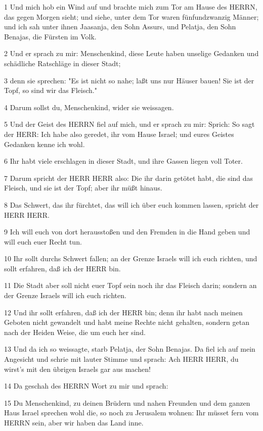 \par 1 Und mich hob ein Wind auf und brachte mich zum Tor am Hause des HERRN, das gegen Morgen sieht; und siehe, unter dem Tor waren fünfundzwanzig Männer; und ich sah unter ihnen Jaasanja, den Sohn Assurs, und Pelatja, den Sohn Benajas, die Fürsten im Volk.
\par 2 Und er sprach zu mir: Menschenkind, diese Leute haben unselige Gedanken und schädliche Ratschläge in dieser Stadt;
\par 3 denn sie sprechen: "Es ist nicht so nahe; laßt uns nur Häuser bauen! Sie ist der Topf, so sind wir das Fleisch."
\par 4 Darum sollst du, Menschenkind, wider sie weissagen.
\par 5 Und der Geist des HERRN fiel auf mich, und er sprach zu mir: Sprich: So sagt der HERR: Ich habe also geredet, ihr vom Hause Israel; und eures Geistes Gedanken kenne ich wohl.
\par 6 Ihr habt viele erschlagen in dieser Stadt, und ihre Gassen liegen voll Toter.
\par 7 Darum spricht der HERR HERR also: Die ihr darin getötet habt, die sind das Fleisch, und sie ist der Topf; aber ihr müßt hinaus.
\par 8 Das Schwert, das ihr fürchtet, das will ich über euch kommen lassen, spricht der HERR HERR.
\par 9 Ich will euch von dort herausstoßen und den Fremden in die Hand geben und will euch euer Recht tun.
\par 10 Ihr sollt durchs Schwert fallen; an der Grenze Israels will ich euch richten, und sollt erfahren, daß ich der HERR bin.
\par 11 Die Stadt aber soll nicht euer Topf sein noch ihr das Fleisch darin; sondern an der Grenze Israels will ich euch richten.
\par 12 Und ihr sollt erfahren, daß ich der HERR bin; denn ihr habt nach meinen Geboten nicht gewandelt und habt meine Rechte nicht gehalten, sondern getan nach der Heiden Weise, die um euch her sind.
\par 13 Und da ich so weissagte, starb Pelatja, der Sohn Benajas. Da fiel ich auf mein Angesicht und schrie mit lauter Stimme und sprach: Ach HERR HERR, du wirst's mit den übrigen Israels gar aus machen!
\par 14 Da geschah des HERRN Wort zu mir und sprach:
\par 15 Du Menschenkind, zu deinen Brüdern und nahen Freunden und dem ganzen Haus Israel sprechen wohl die, so noch zu Jerusalem wohnen: Ihr müsset fern vom HERRN sein, aber wir haben das Land inne.
